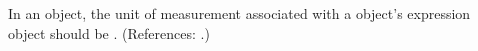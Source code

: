 In an \Event object, the unit of measurement associated with a \Priority
object's  expression object should be .  (References:
.)
